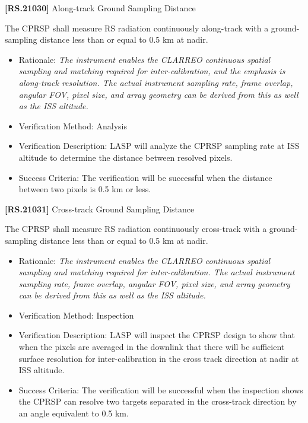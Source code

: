 \textbf{[RS.21030]} Along-track Ground Sampling Distance

The \gls{CPRSP} shall \gls{measure} \gls{RS} radiation continuously along-track with a ground-sampling distance less than or equal to 0.5 km at nadir.

\begin{itemize}
\item{} Rationale: \emph{The instrument enables the CLARREO continuous spatial sampling and matching required for inter-calibration, and the emphasis is along-track resolution. The actual instrument sampling rate, frame overlap, angular FOV, pixel size, and array geometry can be derived from this as well as the ISS altitude.}

\item{} Verification Method: Analysis

\item{} Verification Description: \gls{LASP} will analyze the \gls{CPRSP} sampling rate at \gls{ISS} altitude to determine the distance between resolved pixels.

\item{} Success Criteria: The verification will be successful when the distance between two pixels is 0.5 km or less.

\end{itemize}

\textbf{[RS.21031]} Cross-track Ground Sampling Distance

The \gls{CPRSP} shall \gls{measure} \gls{RS} radiation continuously cross-track with a ground-sampling distance less than or equal to 0.5 km at nadir.

\begin{itemize}
\item{} Rationale: \emph{The instrument enables the CLARREO continuous spatial sampling and matching required for inter-calibration. The actual instrument sampling rate, frame overlap, angular FOV, pixel size, and array geometry can be derived from this as well as the ISS altitude.}

\item{} Verification Method: Inspection

\item{} Verification Description: \gls{LASP} will inspect the \gls{CPRSP} design to show that when the pixels are averaged in the downlink that there will be sufficient surface resolution for inter-calibration in the cross track direction at nadir at \gls{ISS} altitude.

\item{} Success Criteria: The verification will be successful when the \gls{inspection} shows the \gls{CPRSP} can resolve two targets separated in the cross-track direction by an angle equivalent to 0.5 km.

\end{itemize}

